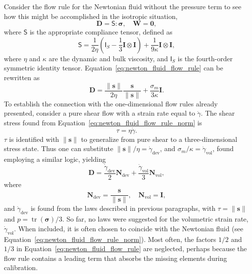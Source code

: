 Consider the flow rule for the Newtonian fluid without the pressure term to see how this might be accomplished in the isotropic situation,
\begin{equation}
	\label{eq:newton_fluid_flow_rule}
	\bm D = \bm{\mathsf S}: \bm \sigma,\quad \bm W = \bm 0,
\end{equation}
where $\bm{\mathsf S}$ is the appropriate compliance tensor, defined as
\begin{equation}
	\bm{\mathsf S} = \frac{1}{2\eta} \left(\bm{\mathsf I}_S - \frac{1}{3} \bm I\otimes\bm I\right) + \frac{1}{9\kappa} \bm I\otimes \bm I,
\end{equation}
where $\eta$ and $\kappa$ are the dynamic and bulk viscosity, and $\bm{\mathsf I}_S$ is the fourth-order symmetric identity tensor.
Equation~\eqref{eq:newton_fluid_flow_rule} can be rewritten as
\begin{equation}
	\label{eq:newton_fluid_flow_rule_norm}
	\bm D = \frac{\|\bm s\|}{2 \eta} \frac{\bm s}{\|\bm s\|} + \frac{\sigma_m}{3\kappa} \bm I.
\end{equation}
To establish the connection with the one-dimensional flow rules already presented, consider a pure shear flow with a strain rate equal to $\dot \gamma$.
The shear stress found from Equation~\eqref{eq:newton_fluid_flow_rule_norm} is
\begin{equation}
	\tau = \eta \dot\gamma.
\end{equation}
$\tau$ is identified with $\|\bm s\|$ to generalize from pure shear to a three-dimensional stress state.
Thus one can substitute $\|\bm s\|/\eta = \dot\gamma_\text{dev}$, and $\sigma_m /\kappa = \dot\gamma_\text{vol}$, found employing a similar logic, yielding
\begin{equation}
	\bm D = \frac{\dot \gamma_\text{dev} }{2} \bm N_\text{dev} + \frac{\dot\gamma_\text{vol} }{3} \bm N_\text{vol},
\end{equation}
where
\begin{equation}
	\label{eq:flow_rule_directions}
	\bm N_\text{dev} = \frac{\bm s}{\|\bm s\|},\quad \bm N_\text{vol} = \bm I,
\end{equation}
and $\dot \gamma_\text{dev}$ is found from the laws described in previous paragraphs, with $\tau=\|\bm s\|$ and $p = \operatorname{tr}(\bm \sigma)/3$.
So far, no laws were suggested for the volumetric strain rate, $\dot \gamma_\text{vol}$.
When included, it is often chosen to coincide with the Newtonian fluid (see Equation~\eqref{eq:newton_fluid_flow_rule_norm}).
Most often, the factors $1/2$ and $1/3$ in Equation~\eqref{eq:newton_fluid_flow_rule} are neglected, perhaps because the flow rule contains a leading term that absorbs the missing elements during calibration.

